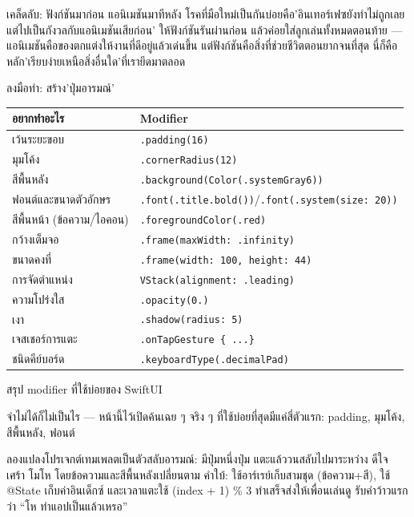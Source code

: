 \begin{tcbinfo}{เคล็ดลับ: ฟังก์ชันมาก่อน แอนิเมชันมาทีหลัง}
โรคที่มือใหม่เป็นกันบ่อยคือ'อินเทอร์เฟซยังทำไม่ถูกเลย แต่ไปเป็นกังวลกับแอนิเมชันเสียก่อน' ให้ฟังก์ชันรันผ่านก่อน แล้วค่อยใส่ลูกเล่นทั้งหมดตอนท้าย — แอนิเมชันคือของตกแต่งให้งานที่ดีอยู่แล้วเด่นขึ้น แต่ฟังก์ชันคือสิ่งที่ช่วยชีวิตตอนยากจนที่สุด นี่ก็คือหลัก'เรียบง่ายเหนือสิ่งอื่นใด'ที่เรายึดมาตลอด

\end{tcbinfo}

\begin{tcbpractice}{ลงมือทำ: สร้าง'ปุ่มอารมณ์'}

\begin{center}
\begin{tabularx}{\linewidth}{|X|X|}
\hline
\textbf{อยากทำอะไร} & \textbf{Modifier} \tabularnewline
\hline
เว้นระยะขอบ & \texttt{.\allowbreak padding(16)} \tabularnewline
มุมโค้ง & \texttt{.\allowbreak cornerRadius(12)} \tabularnewline
สีพื้นหลัง & \texttt{.\allowbreak background(Color(.\allowbreak systemGray6))} \tabularnewline
ฟอนต์และขนาดตัวอักษร & \texttt{.\allowbreak font(.\allowbreak title.\allowbreak bold())}/\texttt{.\allowbreak font(.\allowbreak system(size: 20))} \tabularnewline
สีพื้นหน้า (ข้อความ/ไอคอน) & \texttt{.\allowbreak foregroundColor(.\allowbreak red)} \tabularnewline
กว้างเต็มจอ & \texttt{.\allowbreak frame(maxWidth: .\allowbreak infinity)} \tabularnewline
ขนาดคงที่ & \texttt{.\allowbreak frame(width: 100, height: 44)} \tabularnewline
การจัดตำแหน่ง & \texttt{VStack(alignment: .\allowbreak leading)} \tabularnewline
ความโปร่งใส & \texttt{.\allowbreak opacity(0.\allowbreak 6)} \tabularnewline
เงา & \texttt{.\allowbreak shadow(radius: 5)} \tabularnewline
เจสเชอร์การแตะ & \texttt{.\allowbreak onTapGesture \{ .\allowbreak .\allowbreak .\allowbreak  \}} \tabularnewline
ชนิดคีย์บอร์ด & \texttt{.\allowbreak keyboardType(.\allowbreak decimalPad)} \tabularnewline
\hline
\end{tabularx}
\end{center}

\begin{center}\small\color{gray}สรุป modifier ที่ใช้บ่อยของ SwiftUI\end{center}

จำไม่ได้ก็ไม่เป็นไร — หน้านี้ไว้เปิดค้นเฉย ๆ จริง ๆ ที่ใช้บ่อยที่สุดมีแค่สี่ตัวแรก: padding, มุมโค้ง, สีพื้นหลัง, ฟอนต์

ลองแปลงโปรเจกต์เทมเพลตเป็นตัวสลับอารมณ์: มีปุ่มหนึ่งปุ่ม แตะแล้ววนสลับไปมาระหว่าง ดีใจ เศร้า โมโห โดยข้อความและสีพื้นหลังเปลี่ยนตาม คำใบ้: ใช้อาร์เรย์เก็บสามชุด (ข้อความ+สี), ใช้ @State เก็บค่าอินเด็กซ์ และเวลาแตะใช้ (index + 1) \% 3 ทำเสร็จส่งให้เพื่อนเล่นดู รับคำว้าวแรกว่า “โห ทำแอปเป็นแล้วเหรอ”

\end{tcbpractice}

